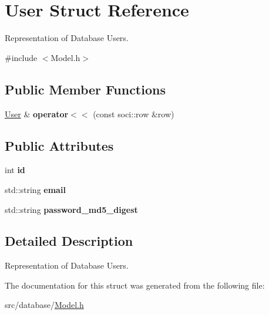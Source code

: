 \hypertarget{struct_user}{\section{User Struct Reference}
\label{struct_user}
}


Representation of Database Users.  




{\ttfamily \#include $<$Model.\-h$>$}

\subsection*{Public Member Functions}
\begin{DoxyCompactItemize}
\item 
\hypertarget{struct_user_a924212dc58b7d4daf16d6b7a071ca2f4}{\hyperlink{struct_user}{User} \& {\bfseries operator$<$$<$} (const soci\-::row \&row)}\label{struct_user_a924212dc58b7d4daf16d6b7a071ca2f4}

\end{DoxyCompactItemize}
\subsection*{Public Attributes}
\begin{DoxyCompactItemize}
\item 
\hypertarget{struct_user_aa7e6e39b43020bbe9c3a196b3689b0f7}{int {\bfseries id}}\label{struct_user_aa7e6e39b43020bbe9c3a196b3689b0f7}

\item 
\hypertarget{struct_user_ac35b7c63228119cb91acdbd7ed32b8cb}{std\-::string {\bfseries email}}\label{struct_user_ac35b7c63228119cb91acdbd7ed32b8cb}

\item 
\hypertarget{struct_user_ab179fc2a093237792a467670b5ada94d}{std\-::string {\bfseries password\-\_\-md5\-\_\-digest}}\label{struct_user_ab179fc2a093237792a467670b5ada94d}

\end{DoxyCompactItemize}


\subsection{Detailed Description}
Representation of Database Users. 

The documentation for this struct was generated from the following file\-:\begin{DoxyCompactItemize}
\item 
src/database/\hyperlink{_model_8h}{Model.\-h}\end{DoxyCompactItemize}
